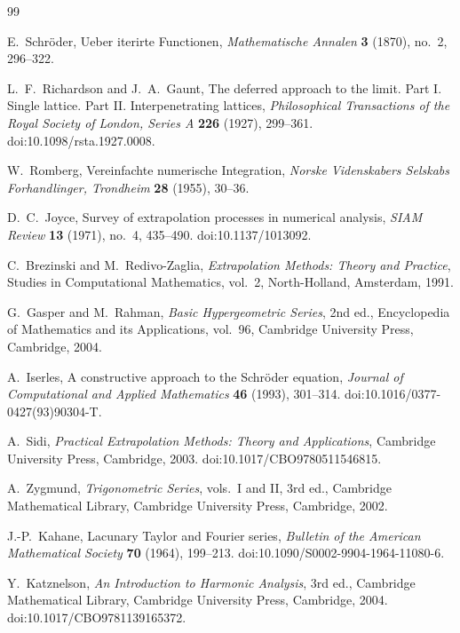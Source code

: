 \documentclass[11pt]{article}
\theoremstyle{remark}
\begin{document}
\begin{thebibliography}{99}

E.~Schr\"oder,
\newblock Ueber iterirte Functionen,
\newblock \emph{Mathematische Annalen} \textbf{3} (1870), no.~2, 296--322.

L.~F.~Richardson and J.~A.~Gaunt,
\newblock The deferred approach to the limit. Part I. Single lattice. Part II.
Interpenetrating lattices,
\newblock \emph{Philosophical Transactions of the Royal Society of London,
Series A} \textbf{226} (1927), 299--361.
\newblock doi:10.1098/rsta.1927.0008.

W.~Romberg,
\newblock Vereinfachte numerische Integration,
\newblock \emph{Norske Videnskabers Selskabs Forhandlinger, Trondheim}
\textbf{28} (1955), 30--36.

D.~C.~Joyce,
\newblock Survey of extrapolation processes in numerical analysis,
\newblock \emph{SIAM Review} \textbf{13} (1971), no.~4, 435--490.
\newblock doi:10.1137/1013092.

C.~Brezinski and M.~Redivo-Zaglia,
\newblock \emph{Extrapolation Methods: Theory and Practice},
\newblock Studies in Computational Mathematics, vol.~2, North-Holland,
Amsterdam, 1991.

G.~Gasper and M.~Rahman,
\newblock \emph{Basic Hypergeometric Series}, 2nd ed.,
\newblock Encyclopedia of Mathematics and its Applications, vol.~96,
Cambridge University Press, Cambridge, 2004.

A.~Iserles,
\newblock A constructive approach to the Schr\"oder equation,
\newblock \emph{Journal of Computational and Applied Mathematics}
\textbf{46} (1993), 301--314.
\newblock doi:10.1016/0377-0427(93)90304-T.

A.~Sidi,
\newblock \emph{Practical Extrapolation Methods: Theory and Applications},
\newblock Cambridge University Press, Cambridge, 2003.
\newblock doi:10.1017/CBO9780511546815.

A.~Zygmund,
\newblock \emph{Trigonometric Series}, vols.~I and II, 3rd ed.,
\newblock Cambridge Mathematical Library, Cambridge University Press,
Cambridge, 2002.

J.-P.~Kahane,
\newblock Lacunary Taylor and Fourier series,
\newblock \emph{Bulletin of the American Mathematical Society}
\textbf{70} (1964), 199--213.
\newblock doi:10.1090/S0002-9904-1964-11080-6.

Y.~Katznelson,
\newblock \emph{An Introduction to Harmonic Analysis}, 3rd ed.,
\newblock Cambridge Mathematical Library, Cambridge University Press,
Cambridge, 2004.
\newblock doi:10.1017/CBO9781139165372.

\end{thebibliography}
\end{document}
